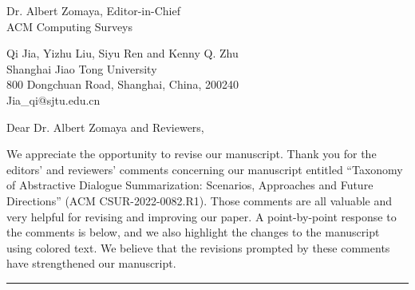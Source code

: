 \documentclass[11pt]{letter} %
\begin{document}

\begin{letter}{
Dr. Albert Zomaya, Editor-in-Chief  \\
ACM Computing Surveys} 



\begin{center}
Qi Jia, Yizhu Liu, Siyu Ren and Kenny Q. Zhu \\ %
Shanghai Jiao Tong University \\ 800 Dongchuan Road, Shanghai, China, 200240 \\
Jia\_qi@sjtu.edu.cn 
\end{center}

\vfill

\signature{Qi Jia, Yizhu Liu, Siyu Ren\\and Kenny Q. Zhu} %


\opening{Dear Dr. Albert Zomaya and Reviewers,} 

We appreciate the opportunity to revise our manuscript. 
Thank you for the editors' and reviewers' comments concerning our 
manuscript entitled ``Taxonomy of Abstractive Dialogue Summarization: Scenarios, Approaches and Future Directions'' (ACM CSUR-2022-0082.R1). 
Those comments are all valuable and very helpful
for revising and improving our paper.
A point-by-point response to the comments is below, and we also highlight the changes to the manuscript using colored text. 
We believe that the revisions prompted by these comments have strengthened our manuscript.
\newline\newline
\newline\hrule


\end{letter}
\end{document}
